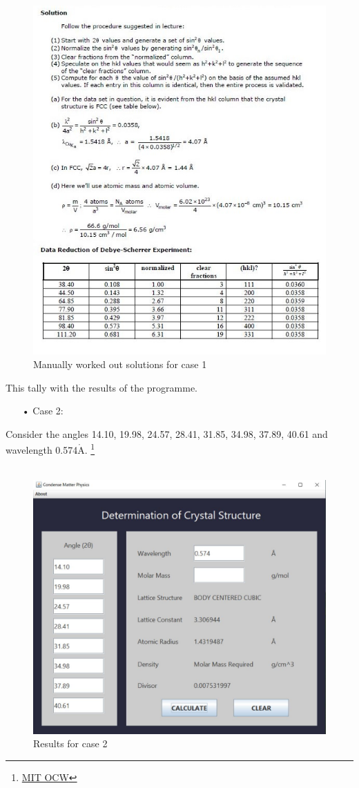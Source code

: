 \documentclass[a4paper]{article}
\begin{document}
\newpage
\begin{figure}[h!]
\centering
\includegraphics[width=450.4 px,height=536.8 px]{3}
\caption{Manually worked out solutions for case 1}
\end{figure}

This tally with the results of the programme.

\newpage

\begin{enumerate}
	\item[•] Case 2:
\end{enumerate}
Consider the angles 14.10, 19.98, 24.57, 28.41, 31.85, 34.98, 37.89, 40.61 and wavelength 0.574$\mathring{\mathrm{A}}$.  \footnote{\href{https://ocw.mit.edu/courses/3-091sc-introduction-to-solid-state-chemistry-fall-2010/ec60f89132400083b748c3dcde9e6e67_MIT3_091SCF09_hw18_sol.pdf}{MIT OCW}}
\\\\
\begin{figure}[h!]
\centering
\includegraphics[width=402 px,height=307.625 px]{5}
\caption{Results for case 2}
\end{figure}
\end{document}
